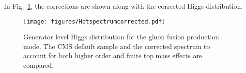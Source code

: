 In Fig.~\ref{fig:Higgspt}, the corrections are shown along with the corrected Higgs \pt distribution.

\begin{table}[htbp]
\label{tab:kfactor}
\end{table}

\begin{figure}[hbtp]\begin{center}
    \texttt{[image: figures/Hptspectrumcorrected.pdf]}
\caption{Generator level Higgs \pt distribution for the gluon fusion production mode. The CMS default \POWHEG sample and the corrected spectrum to account for both higher order and finite top mass effects are compared.}
 \label{fig:Higgspt}
 \end{center}
 \end{figure}


